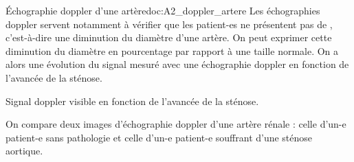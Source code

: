 \begin{doc}{Échographie doppler d'une artère}{doc:A2_doppler_artere}
  Les échographies doppler servent notamment à vérifier que les patient-es ne présentent pas de , c'est-à-dire une diminution du diamètre d'une artère.
  On peut exprimer cette diminution du diamètre en pourcentage par rapport à une taille normale.
  On a alors une évolution du signal mesuré avec une échographie doppler en fonction de l'avancée de la sténose.
  \begin{center}
    
    Signal doppler visible en fonction de l'avancée de la sténose.
  \end{center}

  On compare deux images d'échographie doppler d'une artère rénale : celle d'un-e patient-e sans pathologie et celle d'un-e patient-e souffrant d'une sténose aortique.
  
  \begin{center}
    
  \end{center}
\end{doc}


